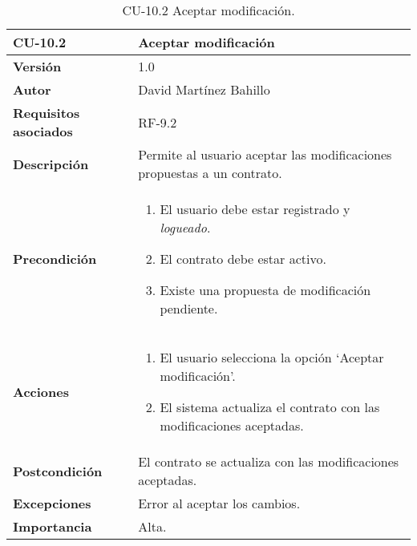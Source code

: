 \begin{table}[p]
	\centering
	\begin{tabularx}{\linewidth}{ p{} p{} }
		\toprule
		\textbf{CU-10.2}  & \textbf{Aceptar modificación}\\
		\midrule
		\textbf{Versión}              & 1.0    \\
		\textbf{Autor}                & David Martínez Bahillo \\
		\textbf{Requisitos asociados} & RF-9.2 \\
		\textbf{Descripción}          & Permite al usuario aceptar las modificaciones propuestas a un contrato. \\
		\textbf{Precondición}         &  
		\begin{enumerate}
			\item El usuario debe estar registrado y \textit{logueado}.
			\item El contrato debe estar activo.
			\item Existe una propuesta de modificación pendiente.
		\end{enumerate}\\
		\textbf{Acciones}             &
		\begin{enumerate}
			\item El usuario selecciona la opción `Aceptar modificación'.
			\item El sistema actualiza el contrato con las modificaciones aceptadas.
		\end{enumerate}\\
		\textbf{Postcondición}        & El contrato se actualiza con las modificaciones aceptadas. \\
		\textbf{Excepciones}          & Error al aceptar los cambios. \\
		\textbf{Importancia}          & Alta. \\
		\bottomrule
	\end{tabularx}
	\caption{CU-10.2 Aceptar modificación.}
\end{table}



